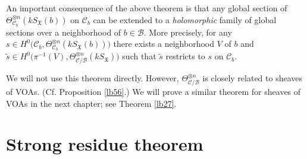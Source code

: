 \documentclass[12pt,a4paper,notitlepage]{report}
\theoremstyle{definition}
\theoremstyle{plain}
\newcommand{\fk}{\mathfrak}
\newcommand{\mc}{\mathcal}
\newcommand{\wtd}{\widetilde}
\newcommand{\SX}{S_{\fk X}}
\numberwithin{equation}{section}
\begin{document}
An important  consequence of the above theorem is that any global section  of $\Theta_{\mc C_b}^{\otimes n}(k\SX(b))$ on $\mc C_b$ can be extended to a \emph{holomorphic} family of global sections over a neighborhood of $b\in\mc B$. More precisely, for any $s\in H^0\big(\mc C_b,\Theta_{\mc C_b}^{\otimes n}(k\SX(b))\big)$ there exists a neighborhood $V$ of $b$ and $\wtd s\in H^0\big(\pi^{-1}(V),\Theta_{\mc C/\mc B}^{\otimes n}(k\SX)\big)$ such that $\wtd s$ restricts to $s$ on $\mc C_b$. 

We will not use this theorem directly. However,  $\Theta_{\mc C/\mc B}^{\otimes n}$ is closely related to sheaves of VOAs. (Cf. Proposition \ref{lb56}.) We will prove a similar theorem for sheaves of VOAs in the next chapter; see Theorem \ref{lb27}.

\section{Strong residue theorem}
\end{document}
